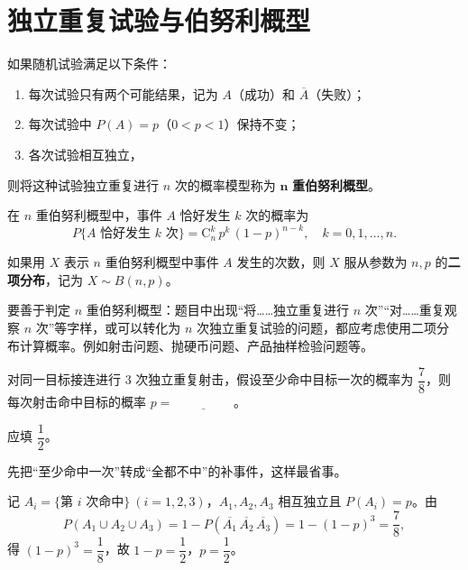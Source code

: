 ﻿\documentclass[lang=cn,11pt]{elegantbook}
\begin{document}
\section{独立重复试验与伯努利概型}

\begin{definition}[\(n\) 重伯努利概型] \label{def:bernoulli}
如果随机试验满足以下条件：
\begin{enumerate}
    \item 每次试验只有两个可能结果，记为 \(A\)（成功）和 \(\overline{A}\)（失败）；
    \item 每次试验中 \(P(A)=p\)（\(0 < p < 1\)）保持不变；
    \item 各次试验相互独立，
\end{enumerate}
则将这种试验独立重复进行 \(n\) 次的概率模型称为 \(\boldsymbol{n}\) \textbf{重伯努利概型}。
\end{definition}

在 \(n\) 重伯努利概型中，事件 \(A\) 恰好发生 \(k\) 次的概率为
\[
P\{A \text{ 恰好发生 } k \text{ 次}\} = \mathrm{C}_n^k\, p^k\, (1-p)^{n-k}, \quad k=0,1,\dots,n.
\]

如果用 \(X\) 表示 \(n\) 重伯努利概型中事件 \(A\) 发生的次数，则 \(X\) 服从参数为 \(n, p\) 的\textbf{二项分布}，记为 \(X \sim B(n,p)\)。

\begin{note}
要善于判定 \(n\) 重伯努利概型：题目中出现“将……独立重复进行 \(n\) 次”“对……重复观察 \(n\) 次”等字样，或可以转化为 \(n\) 次独立重复试验的问题，都应考虑使用二项分布计算概率。例如射击问题、抛硬币问题、产品抽样检验问题等。
\end{note}

\begin{exercise}\label{exer:1-19}
对同一目标接连进行 3 次独立重复射击，假设至少命中目标一次的概率为 \(\dfrac{7}{8}\)，则每次射击命中目标的概率 \(p=\underline{\hspace{2cm}}\)。
\end{exercise}

\begin{solution}
应填 \(\dfrac{1}{2}\)。

先把“至少命中一次”转成“全都不中”的补事件，这样最省事。

记 \(A_i=\{\text{第 }i\text{ 次命中}\}\ (i=1,2,3)\)，\(A_1, A_2, A_3\) 相互独立且 \(P(A_i)=p\)。由
\[
P(A_1 \cup A_2 \cup A_3) = 1 - P(\overline{A_1}\,\overline{A_2}\,\overline{A_3}) = 1 - (1-p)^3 = \frac{7}{8},
\]
得 \((1-p)^3 = \dfrac{1}{8}\)，故 \(1-p = \dfrac{1}{2}\)，\(p = \dfrac{1}{2}\)。
\end{solution}
\end{document}
